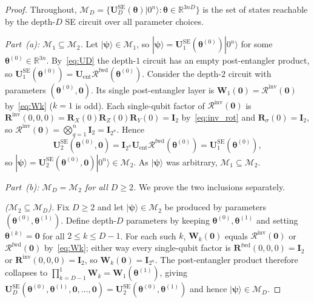 \documentclass[10pt,a4paper]{amsart}
\newcommand{\bbR}{\mathbb{R}}
\newcommand{\cM}{\mathcal{M}}
\begin{document}
\begin{proof}
Throughout, $\cM_D=\{\mathbf{U}_D^{\mathrm{SE}}(\bm\theta)|0^n\rangle:
\bm\theta\in\bbR^{3nD}\}$ is the set of states reachable by the
depth-$D$ SE circuit over all parameter choices.

\textit{Part~(a): $\cM_1\subseteq\cM_2$.}
Let $|\boldsymbol{\psi}\rangle\in\cM_1$, so
$|\boldsymbol{\psi}\rangle=\mathbf{U}_1^{\mathrm{SE}}(\bm\theta^{(0)})|0^n\rangle$ for
some $\bm\theta^{(0)}\in\bbR^{3n}$. By~\eqref{eq:UD} the depth-$1$
circuit has an empty post-entangler product, so
$\mathbf{U}_1^{\mathrm{SE}}(\bm\theta^{(0)})
=\mathbf{U}_{\mathrm{ent}} \mathcal{R}^{\mathrm{fwd}}(\bm\theta^{(0)})$.
Consider the depth-$2$ circuit with parameters
$(\bm\theta^{(0)},\bm 0)$. Its single post-entangler layer is
$\mathbf{W}_1(\bm 0)=\mathcal{R}^{\mathrm{inv}}(\bm 0)$ by~\eqref{eq:Wk}
($k=1$ is odd). Each single-qubit factor of
$\mathcal{R}^{\mathrm{inv}}(\bm 0)$ is
$\mathbf{R}^{\mathrm{inv}}(0,0,0)=\mathbf{R}_X(0)\mathbf{R}_Z(0)\mathbf{R}_Y(0)=\mathbf{I}_2$
by~\eqref{eq:inv_rot} and $\mathbf{R}_\sigma(0)=\mathbf{I}_2$, so
$\mathcal{R}^{\mathrm{inv}}(\bm 0)=\bigotimes_{q=1}^n\mathbf{I}_2=\mathbf{I}_{2^n}$.
Hence
\begin{equation}\label{eq:sat_a}
  \mathbf{U}_2^{\mathrm{SE}}(\bm\theta^{(0)},\bm 0)
  = \mathbf{I}_{2^n} \mathbf{U}_{\mathrm{ent}} 
    \mathcal{R}^{\mathrm{fwd}}(\bm\theta^{(0)})
  = \mathbf{U}_1^{\mathrm{SE}}(\bm\theta^{(0)}),
\end{equation}
so $|\boldsymbol{\psi}\rangle=\mathbf{U}_2^{\mathrm{SE}}(\bm\theta^{(0)},\bm 0)|0^n\rangle
\in\cM_2$. As $|\boldsymbol{\psi}\rangle$ was arbitrary, $\cM_1\subseteq\cM_2$.

\textit{Part~(b): $\cM_D=\cM_2$ for all $D\ge 2$.}
We prove the two inclusions separately.

\emph{($\cM_2\subseteq\cM_D$).} Fix $D\ge 2$ and let
$|\boldsymbol{\psi}\rangle\in\cM_2$ be produced by parameters
$(\bm\theta^{(0)},\bm\theta^{(1)})$. Define depth-$D$ parameters by
keeping $\bm\theta^{(0)},\bm\theta^{(1)}$ and setting
$\bm\theta^{(k)}=\bm 0$ for all $2\le k\le D-1$. For each such $k$,
$\mathbf{W}_k(\bm 0)$ equals $\mathcal{R}^{\mathrm{inv}}(\bm 0)$ or
$\mathcal{R}^{\mathrm{fwd}}(\bm 0)$ by~\eqref{eq:Wk}; either way every
single-qubit factor is $\mathbf{R}^{\mathrm{fwd}}(0,0,0)=\mathbf{I}_2$ or
$\mathbf{R}^{\mathrm{inv}}(0,0,0)=\mathbf{I}_2$, so $\mathbf{W}_k(\bm 0)=\mathbf{I}_{2^n}$. The
post-entangler product therefore collapses to
$\prod_{k=D-1}^{1}\mathbf{W}_k=\mathbf{W}_1(\bm\theta^{(1)})$, giving
$\mathbf{U}_D^{\mathrm{SE}}(\bm\theta^{(0)},\bm\theta^{(1)},\bm 0,\dots,\bm 0)
=\mathbf{U}_2^{\mathrm{SE}}(\bm\theta^{(0)},\bm\theta^{(1)})$ and hence
$|\boldsymbol{\psi}\rangle\in\cM_D$.


\end{proof}
\end{document}
